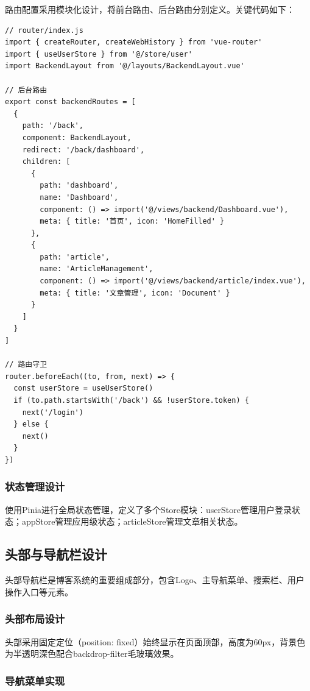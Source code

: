 \documentclass[12pt,a4paper]{article}
\begin{document}
路由配置采用模块化设计，将前台路由、后台路由分别定义。关键代码如下：

\begin{lstlisting}[language={}, caption=路由配置代码]
// router/index.js
import { createRouter, createWebHistory } from 'vue-router'
import { useUserStore } from '@/store/user'
import BackendLayout from '@/layouts/BackendLayout.vue'

// 后台路由
export const backendRoutes = [
  {
    path: '/back',
    component: BackendLayout,
    redirect: '/back/dashboard',
    children: [
      {
        path: 'dashboard',
        name: 'Dashboard',
        component: () => import('@/views/backend/Dashboard.vue'),
        meta: { title: '首页', icon: 'HomeFilled' }
      },
      {
        path: 'article',
        name: 'ArticleManagement',
        component: () => import('@/views/backend/article/index.vue'),
        meta: { title: '文章管理', icon: 'Document' }
      }
    ]
  }
]

// 路由守卫
router.beforeEach((to, from, next) => {
  const userStore = useUserStore()
  if (to.path.startsWith('/back') && !userStore.token) {
    next('/login')
  } else {
    next()
  }
})
\end{lstlisting}

\subsubsection{状态管理设计}

使用Pinia进行全局状态管理，定义了多个Store模块：userStore管理用户登录状态；appStore管理应用级状态；articleStore管理文章相关状态。

\subsection{头部与导航栏设计}

头部导航栏是博客系统的重要组成部分，包含Logo、主导航菜单、搜索栏、用户操作入口等元素。

\subsubsection{头部布局设计}

头部采用固定定位（position: fixed）始终显示在页面顶部，高度为60px，背景色为半透明深色配合backdrop-filter毛玻璃效果。

\subsubsection{导航菜单实现}
\end{document}
